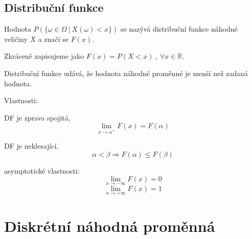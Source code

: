 \subsection{Distribuční funkce}

\begin{compactitem}
    \item Hodnota $P(\{ \omega \in \Omega ~|~ X(\omega) < x \})$ se nazývá distribuční funkce náhodné veličiny $X$ a značí se $F(x)$.

    \item Zkráceně zapisujeme jako $F(x) = P(X < x) ~,~ \forall x \in \mathbb{R}$.

    \item Distribuční funkce udává, že hodnota náhodné proměnné je menší než zadaná hodnota.

    \item Vlastnosti: \begin{compactitem}

        \item DF je zprava spojitá,
        $$ \lim_{x \rightarrow \alpha^{+}} F(x) = F(\alpha) $$

        \item DF je neklesající,
        $$ \alpha < \beta \Rightarrow F(\alpha) \leq F(\beta) $$

        \item asymptotické vlastnosti:
        $$ \lim_{x \rightarrow - \infty} F(x) = 0 $$
        $$ \lim_{x \rightarrow + \infty} F(x) = 1 $$
    \end{compactitem}

\end{compactitem}


\section{Diskrétní náhodná proměnná}

